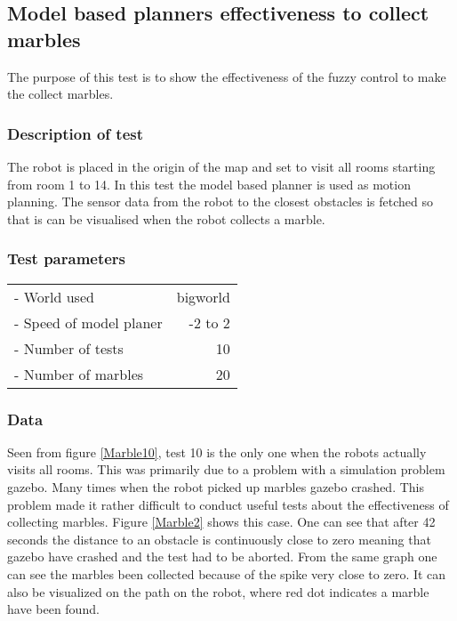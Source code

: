 \documentclass[../Head/Main.tex]{subfiles}
\begin{document}
\subsection{Model based planners effectiveness to collect marbles}
\label{subsec:testCollectMarbles}

The purpose of this test is to show the effectiveness of the fuzzy control to make the collect marbles. 

\subsubsection{Description of test}  

The robot is placed in the origin of the map and set to visit all rooms starting from room 1 to 14. In this test the model based planner is used as motion planning. The sensor data from the robot to the closest obstacles is fetched so that is can be visualised when the robot collects a marble.         

\subsubsection{Test parameters}

\begin{tabular}{l r}
	- World used                & bigworld\\	
	- Speed of model planer     & -2 to 2\\
	- Number of tests           & 10 \\
	- Number of marbles         & 20
\end{tabular}

\subsubsection{Data}
Seen from figure \ref{Marble10}, test 10 is the only one when the robots actually visits all rooms. This was primarily due to a problem with a simulation problem gazebo. Many times when the robot picked up marbles gazebo crashed. This problem made it rather difficult to conduct useful tests about the effectiveness of collecting marbles. Figure \ref{Marble2} shows this case. One can see that after 42 seconds the distance to an obstacle is continuously close to zero meaning that gazebo have crashed and the test had to be aborted. From the same graph one can see the marbles been collected because of the spike very close to zero. It can also be visualized on the path on the robot, where red dot indicates a marble have been found.              
\end{document}
